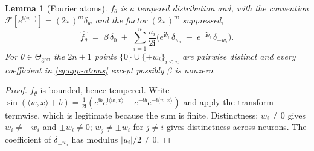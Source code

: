 \documentclass[10pt,twocolumn,letterpaper]{article}
\newtheorem{lemma}[theorem]{Lemma}
\theoremstyle{definition}
\newcommand{\Thgen}{\Theta_{\mathrm{gen}}}
\begin{document}
\begin{lemma}[Fourier atoms]\label{lem:app-atoms}
$f_\theta$ is a tempered distribution and, with the convention
$\mathcal F[e^{\mathrm i\langle w,\cdot\rangle}] = (2\pi)^m \delta_w$ and the factor $(2\pi)^m$
suppressed,
\begin{equation}
\widehat{f_\theta} \;=\; \beta\,\delta_0 \;+\; \sum_{i=1}^{n} \frac{u_i}{2\mathrm i}
\Big( e^{\mathrm i b_i}\,\delta_{w_i} \;-\; e^{-\mathrm i b_i}\,\delta_{-w_i} \Big).
\label{eq:app-atoms}
\end{equation}
For $\theta \in \Thgen$ the $2n+1$ points $\{0\} \cup \{\pm w_i\}_{i \le n}$ are pairwise distinct
and every coefficient in \eqref{eq:app-atoms} except possibly $\beta$ is nonzero.
\end{lemma}

\begin{proof}
$f_\theta$ is bounded, hence tempered. Write
$\sin(\langle w,x\rangle + b) = \frac{1}{2\mathrm i}(e^{\mathrm i b}e^{\mathrm i\langle w,x\rangle}
- e^{-\mathrm i b}e^{-\mathrm i\langle w,x\rangle})$ and apply the transform termwise, which is
legitimate because the sum is finite. Distinctness: $w_i \neq 0$ gives $w_i \neq -w_i$ and
$\pm w_i \neq 0$; $w_j \neq \pm w_i$ for $j\neq i$ gives distinctness across neurons. The
coefficient of $\delta_{\pm w_i}$ has modulus $|u_i|/2 \neq 0$.
\end{proof}
\end{document}
